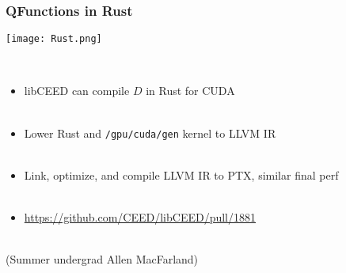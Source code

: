 \documentclass{beamer}
\begin{document}
\begin{frame}
\begin{center}
\frametitle{QFunctions in Rust}

\texttt{[image: Rust.png]}

~\\

\begin{itemize}

\item libCEED can compile {\color{applegreen}$D$} in Rust for CUDA\\

~\\

\item Lower Rust and \lstinline{/gpu/cuda/gen} kernel to LLVM IR\\

~\\

\item Link, optimize, and compile LLVM IR to PTX, similar final perf\\

~\\

\item \href{https://github.com/CEED/libCEED/pull/1881}{https://github.com/CEED/libCEED/pull/1881}\\

\end{itemize}

~\\

(Summer undergrad Allen MacFarland)

\end{center}
\end{frame}

\end{document}
